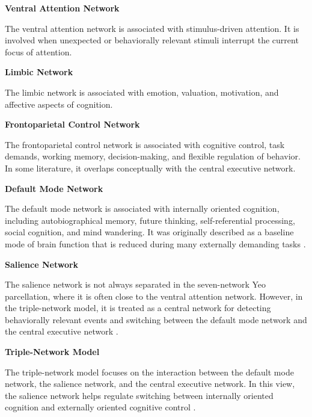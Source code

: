 \documentclass{book}
\providecommand{\ProjectDeepHeading}[2]{%
    \par\medskip\noindent\textbf{#2}\par\smallskip
}
\begin{document}
    
    \ProjectDeepHeading{10}{Ventral Attention Network}
        
        The ventral attention network is associated with stimulus-driven attention. It is involved when unexpected or behaviorally relevant stimuli interrupt the current focus of attention.
    
    
    \ProjectDeepHeading{10}{Limbic Network}
        
        The limbic network is associated with emotion, valuation, motivation, and affective aspects of cognition.
    
    
    \ProjectDeepHeading{10}{Frontoparietal Control Network}
        
        The frontoparietal control network is associated with cognitive control, task demands, working memory, decision-making, and flexible regulation of behavior. In some literature, it overlaps conceptually with the central executive network.
    
    
    \ProjectDeepHeading{10}{Default Mode Network}
        
        The default mode network is associated with internally oriented cognition, including autobiographical memory, future thinking, self-referential processing, social cognition, and mind wandering. It was originally described as a baseline mode of brain function that is reduced during many externally demanding tasks \citep{raichle-2001-a-default-mode-of-brain-function}.
    
    
    \ProjectDeepHeading{10}{Salience Network}
        
        The salience network is not always separated in the seven-network Yeo parcellation, where it is often close to the ventral attention network. However, in the triple-network model, it is treated as a central network for detecting behaviorally relevant events and switching between the default mode network and the central executive network \citep{menon-2011-large-scale-brain-networks-and-psychopathology,menon-2010-saliency-switching-attention-and-control}.
    
    
    \ProjectDeepHeading{10}{Triple-Network Model}
        
        The triple-network model focuses on the interaction between the default mode network, the salience network, and the central executive network. In this view, the salience network helps regulate switching between internally oriented cognition and externally oriented cognitive control \citep{menon-2011-large-scale-brain-networks-and-psychopathology}.
\end{document}
